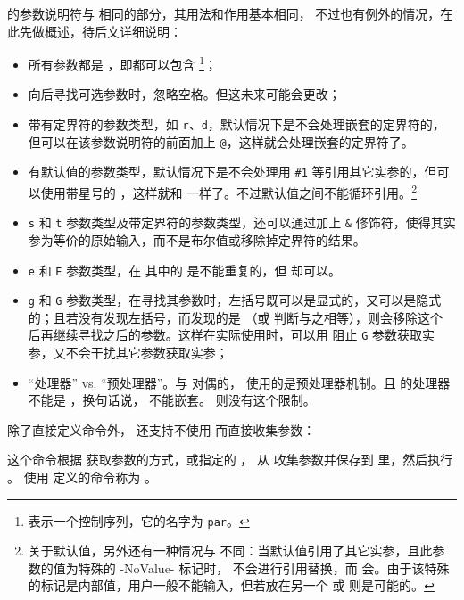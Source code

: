 \documentclass[openany]{book}
\begin{document}
 的参数说明符与  相同的部分，其用法和作用基本相同，
不过也有例外的情况，在此先做概述，待后文详细说明：
\begin{itemize}
  \item 所有参数都是 ，即都可以包含 \footnote{ 表示一个控制序列，它的名字为 \texttt{par}。}；
  \item 向后寻找可选参数时，忽略空格。但这未来可能会更改；
  \item 带有定界符的参数类型，如 \texttt r、\texttt d，默认情况下是不会处理嵌套的定界符的，但可以在该参数说明符的前面加上 \texttt @，这样就会处理嵌套的定界符了。
  \item 有默认值的参数类型，默认情况下是不会处理用 \verb|#1| 等引用其它实参的，但可以使用带星号的 ，这样就和  一样了。不过默认值之间不能循环引用。\footnote{关于默认值，另外还有一种情况与  不同：当默认值引用了其它实参，且此参数的值为特殊的 -NoValue- 标记时， 不会进行引用替换，而  会。由于该特殊的标记是内部值，用户一般不能输入，但若放在另一个  或  则是可能的。}
  \item \texttt s 和 \texttt t 参数类型及带定界符的参数类型，还可以通过加上 \texttt\& 修饰符，使得其实参为等价的原始输入，而不是布尔值或移除掉定界符的结果。
  \item \texttt e 和 \texttt E 参数类型，在  其中的  是不能重复的，但  却可以。
  \item \texttt g 和 \texttt G 参数类型，在寻找其参数时，左括号既可以是显式的，又可以是隐式的；且若没有发现左括号，而发现的是 （或  判断与之相等），则会移除这个  后再继续寻找之后的参数。这样在实际使用时，可以用  阻止 \texttt G 参数获取实参，又不会干扰其它参数获取实参；
  \item “处理器” vs. “预处理器”。与  对偶的， 使用的是预处理器机制。且  的处理器不能是 ，换句话说， 不能嵌套。 则没有这个限制。
\end{itemize}

除了直接定义命令外， 还支持不使用  而直接收集参数：
\begin{syntax}
  \V\DeclareEKeysCollector   {} 
  \V\DeclareEKeysCollector *    
  \V\ekeyscollectargs   {}   
  \V\ekeyscollectargs *    
\end{syntax}
这个命令根据  获取参数的方式，或指定的  ，
从  收集参数并保存到  里，然后执行 。
使用  定义的命令称为 。
\end{document}
